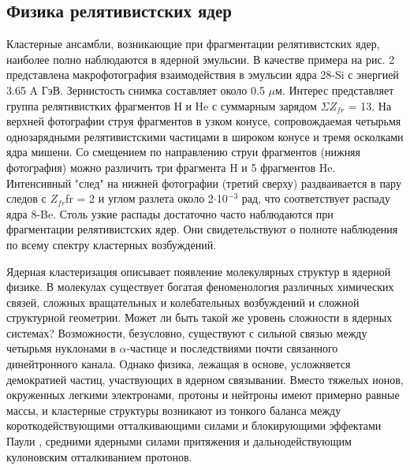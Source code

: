 \documentclass[fontsize=14pt]{scrarticle}
\begin{document}
\subsection{Физика релятивистских ядер}	
\hspace{0.6cm}

Кластерные ансамбли, возникающие при фрагментации релятивистских ядер, наиболее полно наблюдаются в ядерной эмульсии. В качестве примера на рис. 2 представлена макрофотография взаимодействия в эмульсии ядра 28-Si с энергией 3.65 A ГэВ. Зернистость снимка составляет около 0.5 $\mu$м. Интерес представляет группа релятивистких фрагментов Н и He с суммарным зарядом $\Sigma Z_{fr}$ = 13. На верхней фотографии струя фрагментов в узком конусе, сопровождаемая четырьмя однозарядными релятивистскими частицами в широком конусе и тремя осколками ядра мишени. Со смещением по направлению струи фрагментов (нижняя фотография) можно различить три фрагмента H и 5 фрагментов He. Интенсивный "след" на нижней фотографии (третий сверху) раздваивается в пару следов с $Z_{fr}$fr = 2 и углом разлета около 2$\cdot$10$^{-3}$ рад, что соответствует распаду ядра 8-Be. Столь узкие распады достаточно часто наблюдаются при фрагментации релятивистских ядер. Они свидетельствуют о полноте
наблюдения по всему спектру кластерных возбуждений. 
	
	Ядерная кластеризация описывает появление молекулярных структур в ядерной физике. В молекулах существует богатая феноменология различных химических связей, сложных вращательных и колебательных возбуждений и сложной структурной геометрии. Может ли быть такой же уровень сложности в ядерных системах? Возможности, безусловно, существуют с сильной связью между четырьмя нуклонами в $\alpha$-частице и последствиями почти связанного динейтронного канала. Однако физика, лежащая в основе, усложняется демократией частиц, участвующих в ядерном связывании. Вместо тяжелых ионов, окруженных легкими электронами, протоны и нейтроны имеют примерно равные массы, и кластерные структуры возникают из тонкого баланса между короткодействующими отталкивающими силами и блокирующими эффектами Паули , средними ядерными силами притяжения и дальнодействующим кулоновским отталкиванием протонов. 
	
\end{document}
